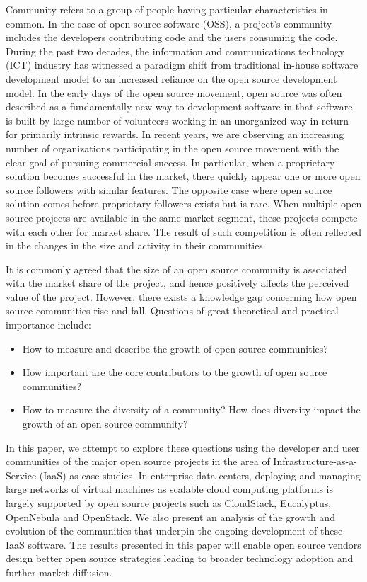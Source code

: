 \documentclass[conference]{IEEEtran}
\begin{document}
Community refers to a group of people having particular characteristics in common. In the case of open source software (OSS), a project's community includes the developers contributing code and the users consuming the code. During the past two decades, the information and communications technology (ICT) industry has witnessed a paradigm shift from traditional in-house software development model to an increased reliance on the open source development model. In the early days of the open source movement, open source was often described as a fundamentally new way to development software in that software is built by large number of volunteers working in an unorganized way in return for primarily intrinsic rewards. In recent years, we are observing an increasing number of organizations participating in the open source movement with the clear goal of pursuing commercial success. In particular, when a proprietary solution becomes successful in the market, there quickly appear one or more open source followers with similar features. The opposite case where open source solution comes before proprietary followers exists but is rare. When multiple open source projects are available in the same market segment, these projects compete with each other for market share. The result of such competition is often reflected in the changes in the size and activity in their communities.  
 
It is commonly agreed that the size of an open source community is associated with the market share of the project, and hence positively affects the perceived value of the project. However, there exists a knowledge gap concerning how open source communities rise and fall. Questions of great theoretical and practical importance include:

\begin{itemize}
	\item How to measure and describe the growth of open source communities?
	\item How important are the core contributors to the growth of open source communities? 
	\item How to measure the diversity of a community? How does diversity impact the growth of an open source community?
\end{itemize}

In this paper, we attempt to explore these questions using the developer and user communities of the major open source projects in the area of Infrastructure-as-a-Service (IaaS) as case studies. In enterprise data centers, deploying and managing large networks of virtual machines as scalable cloud computing platforms is largely supported by open source projects such as CloudStack, Eucalyptus, OpenNebula and OpenStack. We also present an analysis of the growth and evolution of the communities that underpin the ongoing development of these IaaS software. The results presented in this paper will enable open source vendors design better open source strategies leading to broader technology adoption and further market diffusion.
\end{document}
